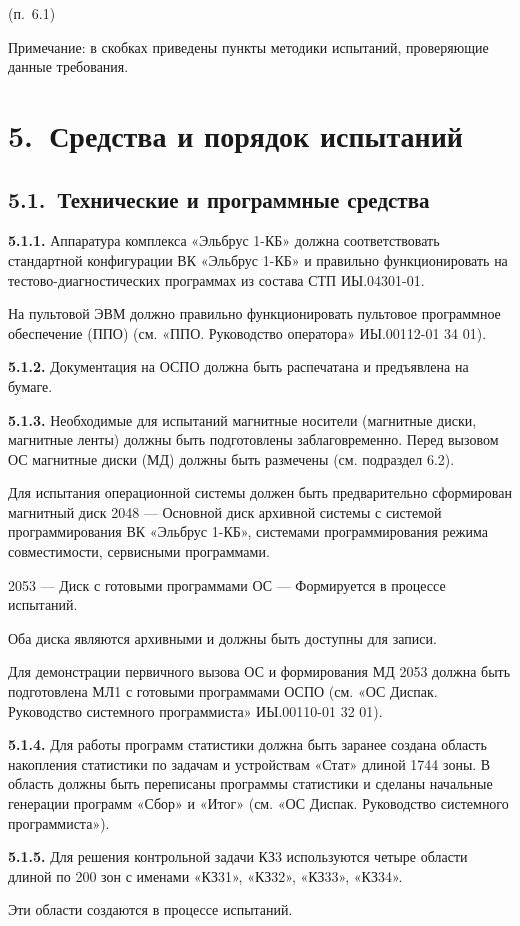 \documentclass[11pt,a4paper]{article}
\begin{document}
\begin{center}(п.~6.1)\end{center}
Примечание: в скобках приведены пункты методики испытаний, проверяющие данные требования.

\section*{5.~Средства и порядок испытаний}
\subsection*{5.1.~Технические и программные средства}
\par\textbf{5.1.1.} Аппаратура комплекса «Эльбрус 1-КБ» должна соответствовать стандартной конфигурации ВК «Эльбрус 1-КБ» и правильно функционировать на тестово-диагностических программах из состава СТП ИЫ.04301-01.\par
На пультовой ЭВМ должно правильно функционировать пультовое программное обеспечение (ППО) (см. «ППО. Руководство оператора» ИЫ.00112-01 34 01).

\par\textbf{5.1.2.} Документация на ОСПО должна быть распечатана и предъявлена на бумаге.\par
\par\textbf{5.1.3.} Необходимые для испытаний магнитные носители (магнитные диски, магнитные ленты) должны быть подготовлены заблаговременно. Перед вызовом ОС магнитные диски (МД) должны быть размечены (см. подраздел 6.2).\par
Для испытания операционной системы должен быть предварительно сформирован магнитный диск 2048 --- Основной диск архивной системы с системой программирования ВК «Эльбрус 1-КБ», системами программирования режима совместимости, сервисными программами.

2053 --- Диск с готовыми программами ОС --- Формируется в процессе испытаний.

Оба диска являются архивными и должны быть доступны для записи.

Для демонстрации первичного вызова ОС и формирования МД 2053 должна быть подготовлена МЛ1 с готовыми программами ОСПО (см. «ОС Диспак. Руководство системного программиста» ИЫ.00110-01 32 01).

\par\textbf{5.1.4.} Для работы программ статистики должна быть заранее создана область накопления статистики по задачам и устройствам «Стат» длиной 1744 зоны. В область должны быть переписаны программы статистики и сделаны начальные генерации программ «Сбор» и «Итог» (см. «ОС Диспак. Руководство системного программиста»).\par
\par\textbf{5.1.5.} Для решения контрольной задачи КЗ3 используются четыре области длиной по 200 зон с именами «КЗ31», «КЗ32», «КЗ33», «КЗ34».\par
Эти области создаются в процессе испытаний.
\end{document}
